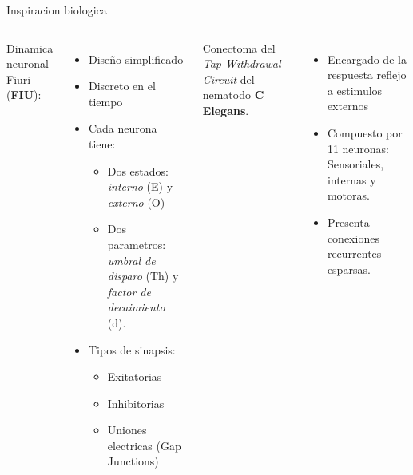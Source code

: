 \begin{frame}{Inspiracion biologica}
    \begin{columns}[T,onlytextwidth]
    Dinamica neuronal Fiuri (\textbf{FIU}):
    \begin{itemize}
        \item Diseño simplificado
        \item Discreto en el tiempo
        \item Cada neurona tiene:
            \begin{itemize}
                \item Dos estados: \textit{interno} (E) y \textit{externo} (O)
                \item Dos parametros: \textit{umbral de disparo} (Th) y \textit{factor de decaimiento} (d).
            \end{itemize}
        \item Tipos de sinapsis:
            \begin{itemize}
                \item Exitatorias
                \item Inhibitorias
                \item Uniones electricas (Gap Junctions)
            \end{itemize}
    \end{itemize}

    Conectoma del \textit{Tap Withdrawal Circuit} del nematodo \textbf{C Elegans}.
    \begin{itemize}
        \item Encargado de la respuesta reflejo a estimulos externos
        \item Compuesto por 11 neuronas: Sensoriales, internas y motoras.
        \item Presenta conexiones recurrentes esparsas.
    \end{itemize}
  \end{columns}
\end{frame}
